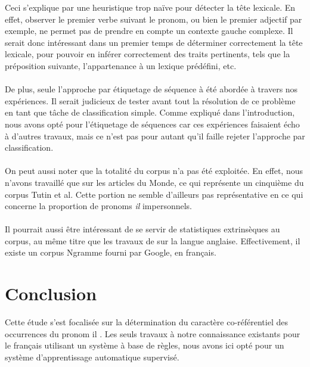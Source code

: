 \documentclass[a4paper,12pt]{article}
\begin{document}
Ceci s'explique par une heuristique trop naïve pour détecter la tête lexicale. En effet, observer le premier verbe suivant le pronom, ou bien le premier adjectif par exemple, ne permet pas de prendre en compte un contexte gauche complexe. Il serait donc intéressant dans un premier temps de déterminer correctement la tête lexicale, pour pouvoir en inférer correctement des traits pertinents, tels que la préposition suivante, l'appartenance à un lexique prédéfini, etc.

\paragraph{}
De plus, seule l'approche par étiquetage de séquence à été abordée à travers nos expériences. Il serait judicieux de tester avant tout la résolution de ce problème en tant que tâche de classification simple. Comme expliqué dans l'introduction, nous avons opté pour l'étiquetage de séquences car ces expériences faisaient écho à d'autres travaux, mais ce n'est pas pour autant qu'il faille rejeter l'approche par classification.

\paragraph{}
On peut aussi noter que la totalité du corpus n'a pas été exploitée. En effet, nous n'avons travaillé que sur les articles du Monde, ce qui représente un cinquième du corpus Tutin et al. Cette portion ne semble d'ailleurs pas représentative en ce qui concerne la proportion de pronoms \og \textit{il} \fg{} impersonnels. 

\paragraph{}
Il pourrait aussi être intéressant de se servir de statistiques extrinsèques au corpus, au même titre que les travaux de \citeauthor{Bergsma-11} sur la langue anglaise. Effectivement, il existe un corpus Ngramme fourni par Google, en français.


\section*{Conclusion}

Cette étude s'est focalisée sur la détermination du caractère co-référentiel des occurrences du pronom \og il \fg{}. Les seuls travaux à notre connaissance existants pour le français utilisant un système à base de règles, nous avons ici opté pour un système d'apprentissage automatique supervisé.
\end{document}
